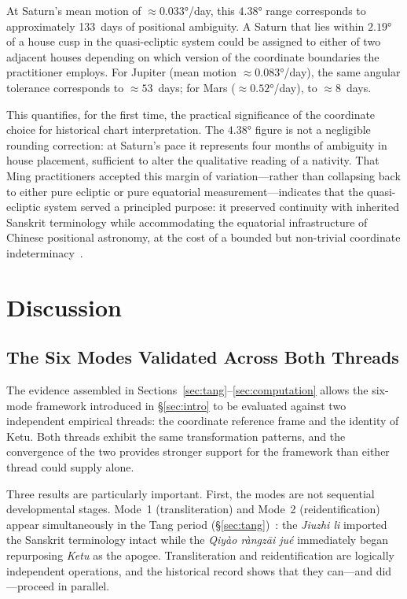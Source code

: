 \documentclass[10pt,a4paper]{article}
\providecommand{\degree}{\ensuremath{°}}
\begin{document}
At Saturn's mean motion of $\approx 0.033\degree$/day, this $4.38\degree$ range
corresponds to approximately 133~days of positional ambiguity.  A Saturn that
lies within $2.19\degree$ of a house cusp in the quasi-ecliptic system could be
assigned to either of two adjacent houses depending on which version of the
coordinate boundaries the practitioner employs.  For Jupiter (mean motion
$\approx 0.083\degree$/day), the same angular tolerance corresponds to
$\approx 53$~days; for Mars ($\approx 0.52\degree$/day), to $\approx 8$~days.

This quantifies, for the first time, the practical significance of the
coordinate choice for historical chart interpretation.  The $4.38\degree$
figure is not a negligible rounding correction: at Saturn's pace it represents
four months of ambiguity in house placement, sufficient to alter the
qualitative reading of a nativity.  That Ming practitioners accepted this
margin of variation---rather than collapsing back to either pure ecliptic or
pure equatorial measurement---indicates that the quasi-ecliptic system served a
principled purpose: it preserved continuity with inherited Sanskrit terminology
while accommodating the equatorial infrastructure of Chinese positional
astronomy, at the cost of a bounded but non-trivial coordinate
indeterminacy~\cite{mak2014pseudoplanets}.

\section{Discussion}\label{sec:discussion}

\subsection*{The Six Modes Validated Across Both Threads}

The evidence assembled in Sections~\ref{sec:tang}--\ref{sec:computation} allows
the six-mode framework introduced in \S\ref{sec:intro} to be evaluated against
two independent empirical threads: the coordinate reference frame and the
identity of Ketu.  Both threads exhibit the same transformation patterns,
and the convergence of the two provides stronger support for the framework than
either thread could supply alone.

Three results are particularly important.  First, the modes are not sequential
developmental stages.  Mode~1 (transliteration) and Mode~2 (reidentification)
appear simultaneously in the Tang period
(\S\ref{sec:tang})~\cite{kotyk2018sinicization,mak2024persian}: the
\textit{Jiuzhi li} imported the Sanskrit terminology intact while the
\textit{Qiy\`ao r\`angz\=ai ju\'e} immediately began repurposing \textit{Ketu} as the apogee.
Transliteration and reidentification are logically independent operations, and
the historical record shows that they can---and did---proceed in parallel.
\end{document}
